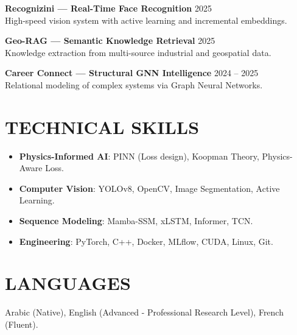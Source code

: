 \documentclass[a4paper,11pt]{article}
\begin{document}
\textbf{Recognizini — Real-Time Face Recognition} \hfill 2025 \\
High-speed vision system with active learning and incremental embeddings.

\textbf{Geo-RAG — Semantic Knowledge Retrieval} \hfill 2025 \\
Knowledge extraction from multi-source industrial and geospatial data.

\textbf{Career Connect — Structural GNN Intelligence} \hfill 2024 -- 2025 \\
Relational modeling of complex systems via Graph Neural Networks.

\section{TECHNICAL SKILLS}
\begin{itemize}
    \item \textbf{Physics-Informed AI}: PINN (Loss design), Koopman Theory, Physics-Aware Loss.
    \item \textbf{Computer Vision}: YOLOv8, OpenCV, Image Segmentation, Active Learning.
    \item \textbf{Sequence Modeling}: Mamba-SSM, xLSTM, Informer, TCN.
    \item \textbf{Engineering}: PyTorch, C++, Docker, MLflow, CUDA, Linux, Git.
\end{itemize}

\section{LANGUAGES}
Arabic (Native), English (Advanced - Professional Research Level), French (Fluent).
\end{document}
